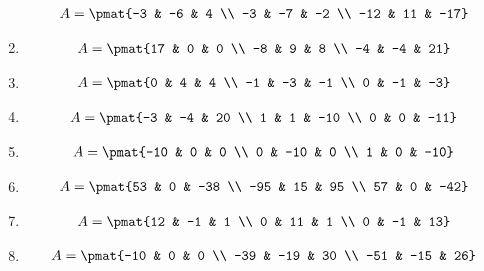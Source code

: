 \begin{enumerate}
\begin{align*}
A = \pmat{-3 & -6 & 4 \\ -3 & -7 & -2 \\ -12 & 11 & -17}
\end{align*}

\item

\begin{align*}
A = \pmat{17 & 0 & 0 \\ -8 & 9 & 8 \\ -4 & -4 & 21}
\end{align*}

\item

\begin{align*}
A = \pmat{0 & 4 & 4 \\ -1 & -3 & -1 \\ 0 & -1 & -3}
\end{align*}

\item

\begin{align*}
A = \pmat{-3 & -4 & 20 \\ 1 & 1 & -10 \\ 0 & 0 & -11}
\end{align*}

\item

\begin{align*}
A = \pmat{-10 & 0 & 0 \\ 0 & -10 & 0 \\ 1 & 0 & -10}
\end{align*}

\item

\begin{align*}
A = \pmat{53 & 0 & -38 \\ -95 & 15 & 95 \\ 57 & 0 & -42}
\end{align*}

\item

\begin{align*}
A = \pmat{12 & -1 & 1 \\ 0 & 11 & 1 \\ 0 & -1 & 13}
\end{align*}

\item

\begin{align*}
A = \pmat{-10 & 0 & 0 \\ -39 & -19 & 30 \\ -51 & -15 & 26}
\end{align*}


\end{enumerate}
